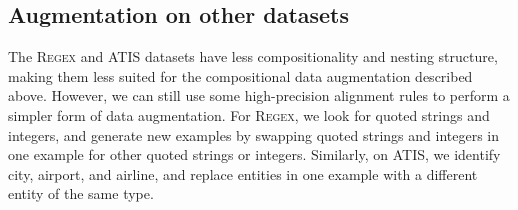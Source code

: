 \documentclass[11pt,letterpaper]{article}
\newcommand{\atis}{\textsc{ATIS}\xspace}
\newcommand{\regex}{\textsc{Regex}\xspace}
\newcommand{\catroot}{\textsc{Root}\xspace}
\newcommand{\catquotstr}{\textsc{Str}\xspace}
\newcommand{\catint}{\textsc{Int}\xspace}
\newcommand\pl[1]{\textcolor{red}{[PL: #1]}}
\newcommand\rj[1]{\textcolor{blue}{[RJ: #1]}}
\begin{document}
\subsection{Augmentation on other datasets}
%
%
%
%
%
%
%
%
%
%
%
The \regex and \atis datasets have 
less compositionality and nesting structure,
making them less suited for the compositional data augmentation
described above.
However, we can still use some high-precision alignment rules
to perform a simpler form of data augmentation.
For \regex, we look for quoted strings and integers,
and generate new examples by
swapping quoted strings and integers in one example
for other quoted strings or integers.
Similarly, on \atis, we identify city, airport, and airline,
and replace entities in one example with a different entity
of the same type.
\end{document}
